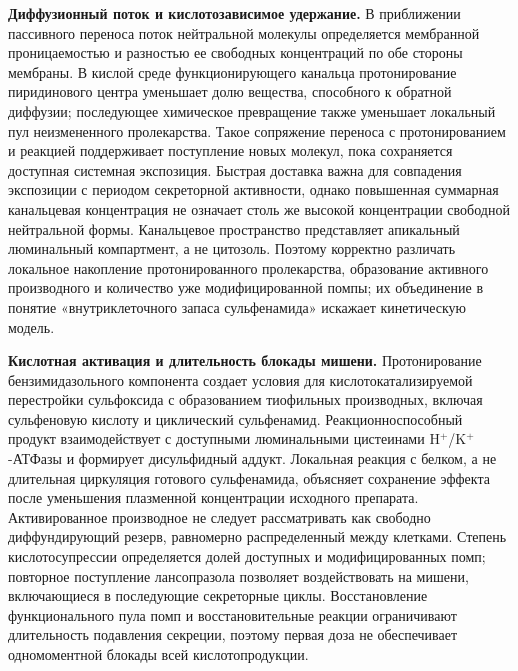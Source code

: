 \documentclass[11pt,a4paper,notitlepage]{report}
\newcommand{\src}[1]{\unskip\space\cite{#1}}
\begin{document}
\textbf{Диффузионный поток и кислотозависимое удержание.} В приближении пассивного переноса поток нейтральной молекулы определяется мембранной проницаемостью и разностью ее свободных концентраций по обе стороны мембраны. В кислой среде функционирующего канальца протонирование пиридинового центра уменьшает долю вещества, способного к обратной диффузии; последующее химическое превращение также уменьшает локальный пул неизмененного пролекарства. Такое сопряжение переноса с протонированием и реакцией поддерживает поступление новых молекул, пока сохраняется доступная системная экспозиция. Быстрая доставка важна для совпадения экспозиции с периодом секреторной активности, однако повышенная суммарная канальцевая концентрация не означает столь же высокой концентрации свободной нейтральной формы. Канальцевое пространство представляет апикальный люминальный компартмент, а не цитозоль. Поэтому корректно различать локальное накопление протонированного пролекарства, образование активного производного и количество уже модифицированной помпы; их объединение в понятие «внутриклеточного запаса сульфенамида» искажает кинетическую модель.\src{molchem,molnagaya90}

\textbf{Кислотная активация и длительность блокады мишени.} Протонирование бензимидазольного компонента создает условия для кислотокатализируемой перестройки сульфоксида с образованием тиофильных производных, включая сульфеновую кислоту и циклический сульфенамид. Реакционноспособный продукт взаимодействует с доступными люминальными цистеинами H$^+$/K$^+$-АТФазы и формирует дисульфидный аддукт. Локальная реакция с белком, а не длительная циркуляция готового сульфенамида, объясняет сохранение эффекта после уменьшения плазменной концентрации исходного препарата. Активированное производное не следует рассматривать как свободно диффундирующий резерв, равномерно распределенный между клетками. Степень кислотосупрессии определяется долей доступных и модифицированных помп; повторное поступление лансопразола позволяет воздействовать на мишени, включающиеся в последующие секреторные циклы. Восстановление функционального пула помп и восстановительные реакции ограничивают длительность подавления секреции, поэтому первая доза не обеспечивает одномоментной блокады всей кислотопродукции.\src{molchem,molnagaya89,molrestore,pharmalabel}
\end{document}
